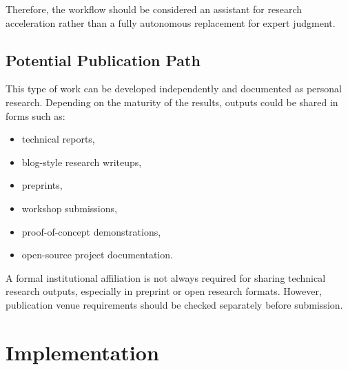 \documentclass[11pt,a4paper]{article}
\begin{document}
Therefore, the workflow should be considered an assistant for research acceleration rather than a fully autonomous replacement for expert judgment.

\subsection{Potential Publication Path}

This type of work can be developed independently and documented as personal research. Depending on the maturity of the results, outputs could be shared in forms such as:
\begin{itemize}
    \item technical reports,
    \item blog-style research writeups,
    \item preprints,
    \item workshop submissions,
    \item proof-of-concept demonstrations,
    \item open-source project documentation.
\end{itemize}

A formal institutional affiliation is not always required for sharing technical research outputs, especially in preprint or open research formats. However, publication venue requirements should be checked separately before submission.

\section{Implementation}
\end{document}
